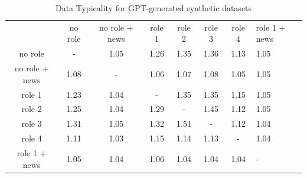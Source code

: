 \documentclass[manuscript]{clv3}
\begin{document}
\pagebreak
{} \label{typtable}
\begin{table} [hbt!]
    \centering
    \begin{tabular}{cccccccl}
         &  no role&  no role + news&  role 1&  role 2&  role 3& role 4 &role 1 + news\\
         no role&  -&  1.05&  1.26&  1.35&  1.36&  1.13&1.05\\
         no role + news&  1.08&  -&  1.06&  1.07&  1.08&  1.05&1.05\\
         role 1&  1.23&  1.04&  -&  1.35&  1.35&  1.15&1.05\\
         role 2&  1.25&  1.04&  1.29&  -&  1.45&  1.12&1.05\\
         role 3&  1.31&  1.05&  1.32&  1.51&  -&  1.12&1.04\\
         role 4&  1.11&  1.03&  1.15&  1.14&  1.13&  -&1.04\\
         role 1 + news&  1.05&  1.04&  1.06&  1.04&  1.04&  1.04&-\\
    \end{tabular}
    \caption{Data Typicality for GPT-generated synthetic datasets}
    \label{tab:typtable}
\end{table}

 \label{full_gsd_results}
\pagebreak
\end{document}
